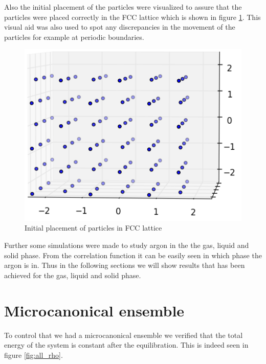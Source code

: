 \documentclass[12pt,a4paper]{report}
\begin{document}
Also the initial placement of the particles were visualized to assure that the particles were placed correctly in the FCC lattice which is shown in figure \ref{fig:init_place}. This visual aid was also used to spot any discrepancies in the movement of the particles for example at periodic boundaries.

\begin{figure}[H]
\centering
\includegraphics[scale=0.5]{fcc.png}
\caption{Initial placement of particles in FCC lattice }
\label{fig:init_place}
\end{figure}

Further some simulations were made to study argon in the the gas, liquid and solid phase. From the correlation function it can be easily seen in which phase the argon is  in. Thus in the following sections we will show results that has been achieved for the gas, liquid and solid phase.

\section{Microcanonical ensemble}

To control that we had a microcanonical ensemble we verified that the total energy of the system is constant after the equilibration. This is indeed seen in figure \ref{fig:all_rho}.
\end{document}
